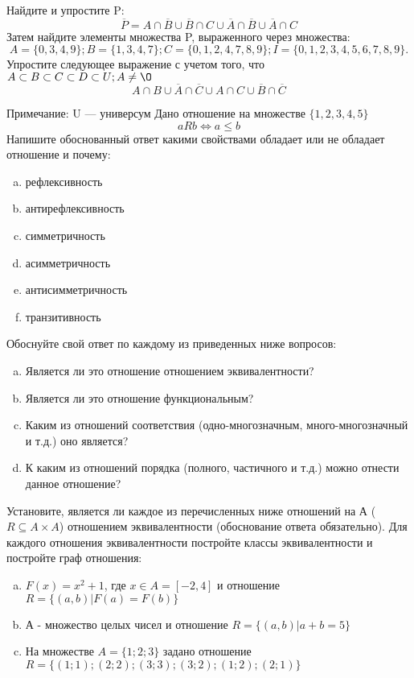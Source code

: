 \documentclass[10pt]{exam}
\begin{document}
\begin{questions}
\question
Найдите и упростите P:
\begin{equation*}
\overline{P} = A \cap \overline{B} \cup \overline{B} \cap C \cup \overline{A} \cap \overline{B} \cup \overline{A} \cap C
\end{equation*}
Затем найдите элементы множества P, выраженного через множества:
\begin{equation*}
A = \{0, 3, 4, 9\}; 
B = \{1, 3, 4, 7\};
C = \{0, 1, 2, 4, 7, 8, 9\};
I = \{0, 1, 2, 3, 4, 5, 6, 7, 8, 9\}.
\end{equation*}\question
Упростите следующее выражение с учетом того, что $A\subset B \subset C \subset D \subset U; A \neq \O$
\begin{equation*}
A \cap B \cup \overline{A} \cap \overline{C} \cup A \cap C \cup \overline{B} \cap \overline{C}
\end{equation*}

Примечание: U — универсум\question
Дано отношение на множестве $\{1, 2, 3, 4, 5\}$ 
\begin{equation*}
aRb \iff a \leq b
\end{equation*}
Напишите обоснованный ответ какими свойствами обладает или не обладает отношение и почему:   
\begin{enumerate} [a)]\setcounter{enumi}{0}
\item рефлексивность
\item антирефлексивность
\item симметричность
\item асимметричность
\item антисимметричность
\item транзитивность
\end{enumerate}

Обоснуйте свой ответ по каждому из приведенных ниже вопросов:
\begin{enumerate} [a)]\setcounter{enumi}{0}
    \item Является ли это отношение отношением эквивалентности?
    \item Является ли это отношение функциональным?
    \item Каким из отношений соответствия (одно-многозначным, много-многозначный и т.д.) оно является?
    \item К каким из отношений порядка (полного, частичного и т.д.) можно отнести данное отношение?
\end{enumerate}


\question
Установите, является ли каждое из перечисленных ниже отношений на А ($R \subseteq A \times A$) отношением эквивалентности (обоснование ответа обязательно). Для каждого отношения эквивалентности постройте классы эквивалентности и постройте граф отношения:
\begin{enumerate} [a)]\setcounter{enumi}{0}
\item $F(x)=x^{2}+1$, где $x \in A = [-2, 4]$ и отношение $R = \{(a,b)|F(a) = F(b)\}$
\item А - множество целых чисел и отношение $R = \{(a,b)|a + b = 5\}$
\item На множестве $A = \{1; 2; 3\}$ задано отношение $R = \{(1; 1); (2; 2); (3; 3); (3; 2); (1; 2); (2; 1)\}$


\end{enumerate}
\end{questions}
\end{document}
